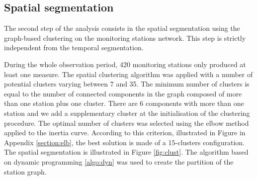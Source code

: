 \subsection{Spatial segmentation}\label{section:clust129}

The second step of the analysis consists in the spatial segmentation using the graph-based clustering on the monitoring stations network. This step is strictly independent from the temporal segmentation. 

During the whole observation period, 420 monitoring stations only produced at least one measure. The spatial clustering algorithm was applied with a number of potential clusters varying between 7 and 35. The minimum number of clusters is equal to the number of connected components in the graph composed of more than one station plus one cluster. There are 6 components with more than one station and we add a supplementary cluster at the initialisation of the clustering procedure. The optimal number of clusters was selected using the elbow method applied to the inertia curve. According to this criterion, illustrated in Figure  in Appendix \ref{section:elb}, the best solution is made of a 15-clusters configuration. The spatial segmentation is illustrated in Figure \ref{fig:clust}. The algorithm based on dynamic programming \ref{algo:dyn} was used to create the partition of the station graph.
